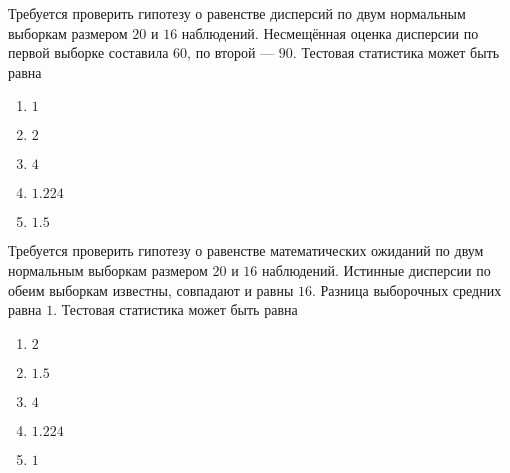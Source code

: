 \documentclass[t]{beamer}
\begin{document}
 \begin{frame} \label{3} 
\begin{block}{3} 

  Требуется проверить гипотезу о равенстве дисперсий по двум нормальным выборкам размером $20$ и $16$ наблюдений. Несмещённая оценка дисперсии по первой выборке составила $60$, по второй — $90$. Тестовая статистика может быть равна
  


 \end{block} 
\begin{enumerate} 
\item[] \hyperlink{3-No}{\beamergotobutton{} $1$}
\item[] \hyperlink{3-No}{\beamergotobutton{} $2$}
\item[] \hyperlink{3-No}{\beamergotobutton{} $4$}
\item[] \hyperlink{3-No}{\beamergotobutton{} $1.224$}
\item[] \hyperlink{3-Yes}{\beamergotobutton{} $1.5$}
\end{enumerate} 
\end{frame} 


 \begin{frame} \label{4} 
\begin{block}{4} 

  Требуется проверить гипотезу о равенстве математических ожиданий по двум нормальным выборкам размером $20$ и $16$ наблюдений. Истинные дисперсии по обеим выборкам известны, совпадают и равны $16$. Разница выборочных средних равна $1$. Тестовая статистика может быть равна
  


 \end{block} 
\begin{enumerate} 
\item[] \hyperlink{4-No}{\beamergotobutton{} $2$}
\item[] \hyperlink{4-No}{\beamergotobutton{} $1.5$}
\item[] \hyperlink{4-No}{\beamergotobutton{} $4$}
\item[] \hyperlink{4-No}{\beamergotobutton{} $1.224$}
\item[] \hyperlink{4-No}{\beamergotobutton{} $1$}
\end{enumerate} 
\end{frame} 
\end{document}
